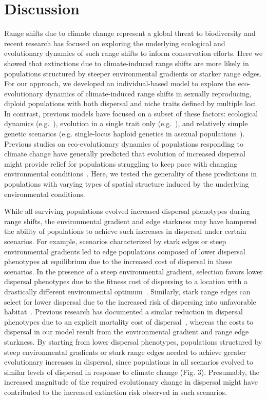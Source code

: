 \documentclass[11pt]{article}
\begin{document}
\section*{Discussion}
Range shifts due to climate change represent a global threat to biodiversity and recent research has focused on exploring the underlying ecological and evolutionary dynamics of such range shifts to inform conservation efforts. Here we showed that extinctions due to climate-induced range shifts are more likely in populations structured by steeper environmental gradients or starker range edges. For our approach, we developed an individual-based model to explore the eco-evolutionary dynamics of climate-induced range shifts in sexually reproducing, diploid populations with both dispersal and niche traits defined by multiple loci. In contrast, previous models have focused on a subset of these factors: ecological dynamics (e.g.~\citep{brooker2007modelling}), evolution in a single trait only (e.g.~\citep{atkins2010local, henry2013eco}), and relatively simple genetic scenarios (e.g. single-locus haploid genetics in asexual populations~\citep{boeye2013more, hargreaves2015fitness}).  Previous studies on eco-evolutionary dynamics of populations responding to climate change have generally predicted that evolution of increased dispersal might provide relief for populations struggling to keep pace with changing environmental conditions~\citep{boeye2013more, henry2013eco, hargreaves2015fitness}. Here, we tested the generality of these predictions in populations with varying types of spatial structure induced by the underlying environmental conditions. 

While all surviving populations evolved increased dispersal phenotypes during range shifts, the environmental gradient and edge starkness may have hampered the ability of populations to achieve such increases in dispersal under certain scenarios. For example, scenarios characterized by stark edges or steep environmental gradients led to edge populations composed of lower dispersal phenotypes at equilibrium due to the increased cost of dispersal in these scenarios. In the presence of a steep environmental gradient, selection favors lower dispersal phenotypes due to the fitness cost of dispersing to a location with a drastically different environmental optimum~\citep{kirkpatrick1997evolution}. Similarly, stark range edges can select for lower dispersal due to the increased risk of dispersing into unfavorable habitat~\citep{shaw2014population, shaw2019evolution}. Previous research has documented a similar reduction in dispersal phenotypes due to an explicit mortality cost of dispersal~\citep{kubisch2013predicting}, whereas the costs to dispersal in our model result from the environmental gradient and range edge starkness. By starting from lower dispersal phenotypes, populations structured by steep environmental gradients or stark range edges needed to achieve greater evolutionary increases in dispersal, since populations in all scenarios evolved to similar levels of dispersal in response to climate change (Fig. 3). Presumably, the increased magnitude of the required evolutionary change in dispersal might have contributed to the increased extinction risk observed in such scenarios.
\end{document}
